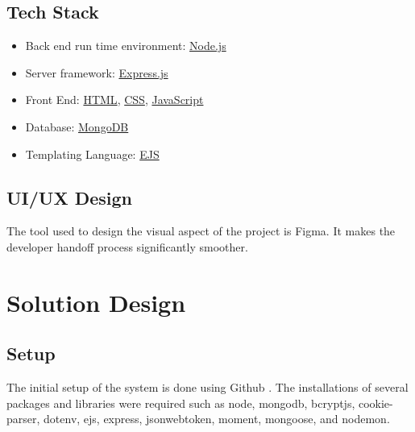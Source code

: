\documentclass[conference]{IEEEtran}
\begin{document}
\subsection{Tech Stack}
\begin{itemize}
    \item Back end run time environment: \href{https://nodejs.org/en/}{Node.js\cite{b3}}
    \item Server framework: \href{https://expressjs.com/}{Express.js\cite{b4}}
    \item Front End: \href{https://www.w3schools.com/html/default.asp}{HTML\cite{b5}}, \href{https://www.w3schools.com/css/default.asp}{CSS\cite{b6}}, \href{https://www.javascript.com/}{JavaScript\cite{b7}}
    \item Database: \href{https://www.mongodb.com/}{MongoDB\cite{b8}}
    \item Templating Language: \href{https://ejs.co/}{EJS\cite{b9}}
\end{itemize}
\subsection{UI/UX Design}
The tool used to design the visual aspect of the project is Figma. It makes the developer handoff process significantly smoother.
\section{Solution Design}
\subsection{Setup}
The initial setup of the system is done using Github . The installations of several packages and libraries were required such as node, mongodb,  bcryptjs, cookie-parser, dotenv, ejs, express, jsonwebtoken, moment, mongoose, and nodemon.\\
\end{document}
